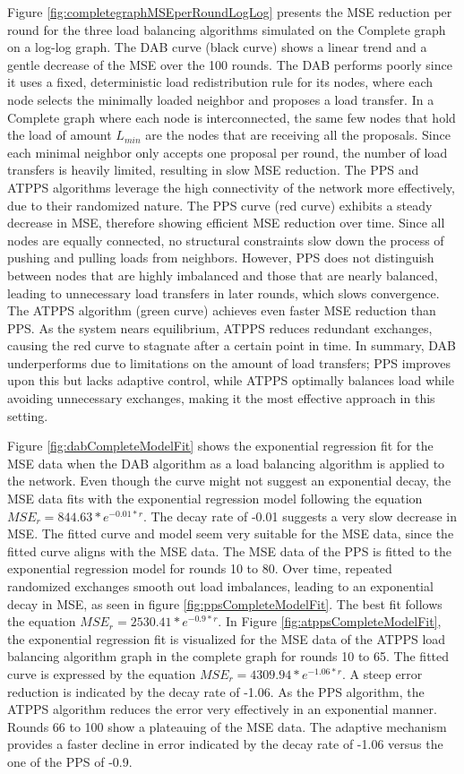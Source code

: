 Figure \ref{fig:completegraphMSEperRoundLogLog} presents the MSE reduction per round for the three load balancing algorithms simulated on the Complete graph on a log-log graph. The DAB curve (black curve) shows a linear trend and a gentle decrease of the MSE over the 100 rounds. The DAB performs poorly since it uses a fixed, deterministic load redistribution rule for its nodes, where each node selects the minimally loaded neighbor and proposes a load transfer. In a Complete graph where each node is interconnected, the same few nodes that hold the load of amount $L_{min}$ are the nodes that are receiving all the proposals. Since each minimal neighbor only accepts one proposal per round, the number of load transfers is heavily limited, resulting in slow MSE reduction. The PPS and ATPPS algorithms leverage the high connectivity of the network more effectively, due to their randomized nature. The PPS curve (red curve) exhibits a steady decrease in MSE, therefore showing efficient MSE reduction over time. Since all nodes are equally connected, no structural constraints slow down the process of pushing and pulling loads from neighbors. However, PPS does not distinguish between nodes that are highly imbalanced and those that are nearly balanced, leading to unnecessary load transfers in later rounds, which slows convergence. The ATPPS algorithm (green curve) achieves even faster MSE reduction than PPS. As the system nears equilibrium, ATPPS reduces redundant exchanges, causing the red curve to stagnate after a certain point in time. In summary, DAB underperforms due to limitations on the amount of load transfers; PPS improves upon this but lacks adaptive control, while ATPPS optimally balances load while avoiding unnecessary exchanges, making it the most effective approach in this setting.

Figure \ref{fig:dabCompleteModelFit} shows the exponential regression fit for the MSE data when the DAB algorithm as a load balancing algorithm is applied to the network. Even though the curve might not suggest an exponential decay, the MSE data fits with the exponential regression model following the equation $MSE_r=844.63*e^{-0.01*r}$. The decay rate of -0.01 suggests a very slow decrease in MSE. The fitted curve and model seem very suitable for the MSE data, since the fitted curve aligns with the MSE data. The MSE data of the PPS is fitted to the exponential regression model for rounds 10 to 80. Over time, repeated randomized exchanges smooth out load imbalances, leading to an exponential decay in MSE, as seen in figure \ref{fig:ppsCompleteModelFit}. The best fit follows the equation $MSE_r=2530.41*e^{-0.9*r}$. In Figure \ref{fig:atppsCompleteModelFit}, the exponential regression fit is visualized for the MSE data of the ATPPS load balancing algorithm graph in the complete graph for rounds 10 to 65. The fitted curve is expressed by the equation $MSE_r=4309.94*e^{-1.06*r}$. A steep error reduction is indicated by the decay rate of -1.06. As the PPS algorithm, the ATPPS algorithm reduces the error very effectively in an exponential manner. Rounds 66 to 100 show a plateauing of the MSE data. The adaptive mechanism provides a faster decline in error indicated by the decay rate of -1.06 versus the one of the PPS of -0.9.

